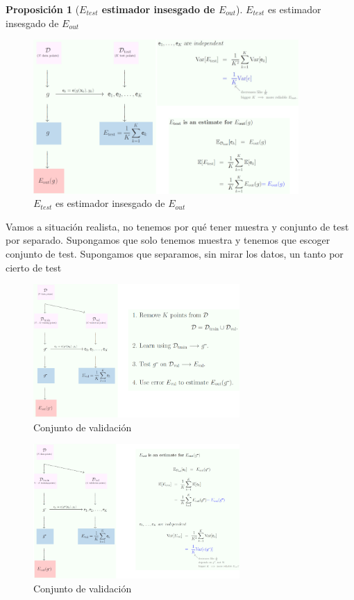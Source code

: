 \documentclass[11pt,a4paper]{article}
\theoremstyle{definition}
\newtheorem{proposition}{Proposición}[section]
\begin{document}
	\begin{proposition}[\textbf{$E_{test}$ estimador insesgado de $E_{out}$}]
	$E_{test}$ es estimador insesgado de $E_{out}$
	\begin{figure}[H]
		\centering
		\includegraphics[width=0.9\textwidth]{images/etest_unbiased_eout}
		\caption{$E_{test}$ es estimador insesgado de $E_{out}$}
	\end{figure}
	\end{proposition}
	Vamos a situación realista, no tenemos por qué tener muestra y conjunto de test por separado. Supongamos que solo tenemos muestra y tenemos que escoger conjunto de test. Supongamos que separamos, sin mirar los datos, un tanto por cierto de test
	\begin{figure}[H]
		\centering
		\includegraphics[width=0.7\textwidth]{images/val_set}
		\caption{Conjunto de validación}
	\end{figure}
	\begin{figure}[H]
		\centering
		\includegraphics[width=0.7\textwidth]{images/val_set2}
		\caption{Conjunto de validación}
	\end{figure}
\end{document}
